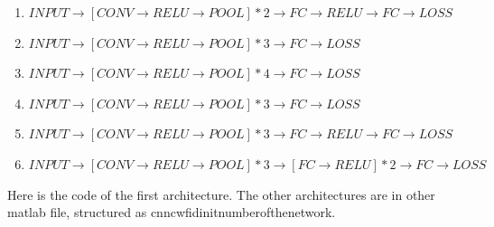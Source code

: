 \documentclass[]{report}
\begin{document}
\begin{enumerate}

\item $ INPUT \rightarrow [CONV \rightarrow RELU \rightarrow POOL]*2 \rightarrow FC \rightarrow RELU \rightarrow FC \rightarrow LOSS $ 

\item $ INPUT \rightarrow [CONV \rightarrow RELU \rightarrow POOL]*3 \rightarrow FC \rightarrow LOSS $ 

\item $ INPUT \rightarrow [CONV \rightarrow RELU \rightarrow POOL]*4 \rightarrow FC \rightarrow LOSS $ 

\item $ INPUT \rightarrow [CONV \rightarrow RELU \rightarrow POOL]*3 \rightarrow FC \rightarrow LOSS $ 

\item $ INPUT \rightarrow [CONV \rightarrow RELU \rightarrow POOL]*3 \rightarrow FC \rightarrow RELU \rightarrow FC \rightarrow LOSS $ 

\item $ INPUT \rightarrow [CONV \rightarrow RELU \rightarrow POOL]*3 \rightarrow [FC \rightarrow RELU]*2 \rightarrow FC \rightarrow LOSS $ 

\end{enumerate}

Here is the code of the first architecture. The other architectures are in other matlab file, structured as cnn\textunderscore cwfid\textunderscore init\textunderscore number\textunderscore of\textunderscore the\textunderscore network.
\end{document}
